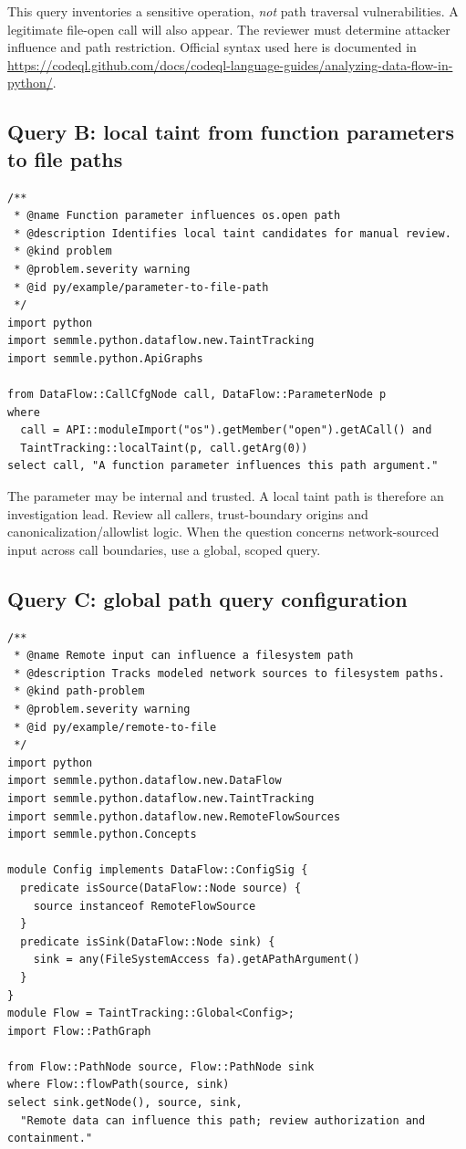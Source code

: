 \documentclass[11pt,letterpaper,oneside]{book}
\begin{document}
This query inventories a sensitive operation, \emph{not} path traversal vulnerabilities. A legitimate file-open call will also appear. The reviewer must determine attacker influence and path restriction. Official syntax used here is documented in \url{https://codeql.github.com/docs/codeql-language-guides/analyzing-data-flow-in-python/}.

\subsection{Query B: local taint from function parameters to file paths}

\begin{lstlisting}[caption={CodeQL/Python: local candidate flow}]
/**
 * @name Function parameter influences os.open path
 * @description Identifies local taint candidates for manual review.
 * @kind problem
 * @problem.severity warning
 * @id py/example/parameter-to-file-path
 */
import python
import semmle.python.dataflow.new.TaintTracking
import semmle.python.ApiGraphs

from DataFlow::CallCfgNode call, DataFlow::ParameterNode p
where
  call = API::moduleImport("os").getMember("open").getACall() and
  TaintTracking::localTaint(p, call.getArg(0))
select call, "A function parameter influences this path argument."
\end{lstlisting}

The parameter may be internal and trusted. A local taint path is therefore an investigation lead. Review all callers, trust-boundary origins and canonicalization/allowlist logic. When the question concerns network-sourced input across call boundaries, use a global, scoped query.

\subsection{Query C: global path query configuration}

\begin{lstlisting}[caption={CodeQL/Python: documentation-derived global path query}]
/**
 * @name Remote input can influence a filesystem path
 * @description Tracks modeled network sources to filesystem paths.
 * @kind path-problem
 * @problem.severity warning
 * @id py/example/remote-to-file
 */
import python
import semmle.python.dataflow.new.DataFlow
import semmle.python.dataflow.new.TaintTracking
import semmle.python.dataflow.new.RemoteFlowSources
import semmle.python.Concepts

module Config implements DataFlow::ConfigSig {
  predicate isSource(DataFlow::Node source) {
    source instanceof RemoteFlowSource
  }
  predicate isSink(DataFlow::Node sink) {
    sink = any(FileSystemAccess fa).getAPathArgument()
  }
}
module Flow = TaintTracking::Global<Config>;
import Flow::PathGraph

from Flow::PathNode source, Flow::PathNode sink
where Flow::flowPath(source, sink)
select sink.getNode(), source, sink,
  "Remote data can influence this path; review authorization and containment."
\end{lstlisting}
\end{document}

